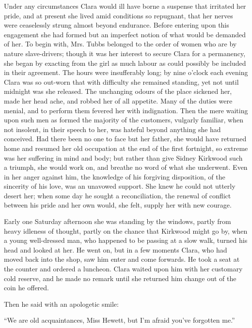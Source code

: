 Under any circumstances Clara would ill have borne a suspense that
irritated her pride, and at present she lived amid conditions so
repugnant, that her nerves were ceaselessly strung almost beyond
endurance. Before {\protect\hypertarget{203}{}{}}entering upon this
engagement she had formed but an imperfect notion of what would be
demanded of her. To begin with, Mrs. Tubbs belonged to the order of
women who are by nature slave-drivers; though it was her interest to
secure Clara for a permanency, she began by exacting from the girl as
much labour as could possibly be included in their agreement. The hours
were insufferably long; by nine o'clock each evening Clara was so
out-worn that with difficulty she remained standing, yet not until
midnight was she released. The unchanging odours of the place sickened
her, made her head ache, and robbed her of all appetite. Many of the
duties were menial, and to perform them fevered her with indignation.
Then the mere waiting upon such men as formed the majority of the
customers, vulgarly familiar, when not insolent, in their speech to her,
was hateful beyond anything she had conceived. Had there been no one to
face but her father, she would have returned home and resumed her old
occupation at the end of the first fortnight, so extreme
{\protect\hypertarget{204}{}{}}was her suffering in mind and body; but
rather than give Sidney Kirkwood such a triumph, she would work on, and
breathe no word of what she underwent. Even in her anger against him,
the knowledge of his forgiving disposition, of the sincerity of his
love, was an unavowed support. She knew he could not utterly desert her;
when some day he sought a reconciliation, the renewal of conflict
between his pride and her own would, she felt, supply her with new
courage.

Early one Saturday afternoon she was standing by the windows, partly
from heavy idleness of thought, partly on the chance that Kirkwood might
go by, when a young well-dressed man, who happened to be passing at a
slow walk, turned his head and looked at her. He went on, but in a few
moments Clara, who had moved back into the shop, saw him enter and come
forwards. He took a seat at the counter and ordered a luncheon. Clara
waited upon him with her customary cold reserve, and he made no remark
until she returned him change out of the coin he offered.

{\protect\hypertarget{205}{}{}}Then he said with an apologetic smile:

``We are old acquaintances, Miss Hewett, but I'm afraid you've forgotten
me.''


